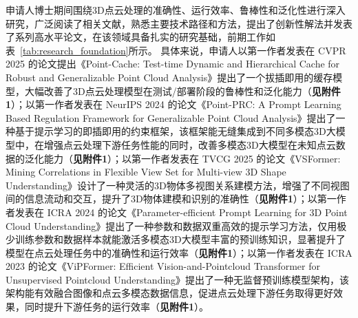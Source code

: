 \documentclass[12pt]{article}
\begin{document}
申请人博士期间围绕3D点云处理的准确性、运行效率、鲁棒性和泛化性进行深入研究，广泛阅读了相关文献，熟悉主要技术路径和方法，提出了创新性解法并发表了系列高水平论文，在该领域具备扎实的研究基础，前期工作如表~\ref{tab:research_foundation}所示。
具体来说，申请人以第一作者发表在 CVPR 2025 的论文提出《Point-Cache: Test-time Dynamic and Hierarchical Cache for Robust and Generalizable Point Cloud Analysis》提出了一个拔插即用的缓存模型，大幅改善了3D点云处理模型在测试/部署阶段的鲁棒性和泛化能力（\textbf{见附件1}）；以第一作者发表在 NeurIPS 2024 的论文《Point-PRC: A Prompt Learning Based Regulation Framework for Generalizable Point Cloud Analysis》提出了一种基于提示学习的即插即用的约束框架，该框架能无缝集成到不同多模态3D大模型中，在增强点云处理下游任务性能的同时，改善多模态3D大模型在未知点云数据的泛化能力（\textbf{见附件1}）；以第一作者发表在 TVCG 2025 的论文《VSFormer: Mining Correlations in Flexible View Set for Multi-view 3D Shape Understanding》设计了一种灵活的3D物体多视图关系建模方法，增强了不同视图间的信息流动和交互，提升了3D物体建模和识别的准确性（\textbf{见附件1}）；以第一作者发表在 ICRA 2024 的论文《Parameter-efficient Prompt Learning for 3D Point Cloud Understanding》提出了一种参数和数据双重高效的提示学习方法，仅用极少训练参数和数据样本就能激活多模态3D大模型丰富的预训练知识，显著提升了模型在点云处理任务中的准确性和运行效率（\textbf{见附件1}）；以第一作者发表在 ICRA 2023 的论文《ViPFormer: Efficient Vision-and-Pointcloud Transformer for Unsupervised Pointcloud Understanding》提出了一种无监督预训练模型架构，该架构能有效融合图像和点云多模态数据信息，促进点云处理下游任务取得更好效果，同时提升下游任务的运行效率（\textbf{见附件1}）。
\end{document}
